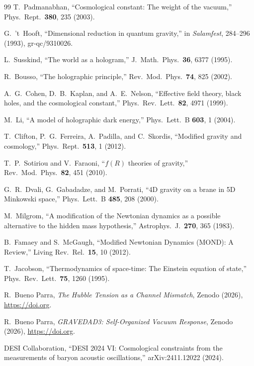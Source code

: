 \documentclass[prd,
               reprint,
               aps,
               preprintnumbers,
               nofootinbib,
               longbibliography,
               floatfix]{revtex4-2}
\begin{document}
\begin{thebibliography}{99}
T.~Padmanabhan,
``Cosmological constant: The weight of the vacuum,''
Phys.\ Rept.\ {\bf 380}, 235 (2003).

G.~'t~Hooft,
``Dimensional reduction in quantum gravity,''
in \emph{Salamfest}, 284--296 (1993), gr-qc/9310026.

L.~Susskind,
``The world as a hologram,''
J.\ Math.\ Phys.\ {\bf 36}, 6377 (1995).

R.~Bousso,
``The holographic principle,''
Rev.\ Mod.\ Phys.\ {\bf 74}, 825 (2002).

A.~G.~Cohen, D.~B.~Kaplan, and A.~E.~Nelson,
``Effective field theory, black holes, and the cosmological constant,''
Phys.\ Rev.\ Lett.\ {\bf 82}, 4971 (1999).

M.~Li,
``A model of holographic dark energy,''
Phys.\ Lett.\ B {\bf 603}, 1 (2004).

T.~Clifton, P.~G.~Ferreira, A.~Padilla, and C.~Skordis,
``Modified gravity and cosmology,''
Phys.\ Rept.\ {\bf 513}, 1 (2012).

T.~P.~Sotiriou and V.~Faraoni,
``$f(R)$ theories of gravity,''
Rev.\ Mod.\ Phys.\ {\bf 82}, 451 (2010).

G.~R.~Dvali, G.~Gabadadze, and M.~Porrati,
``4D gravity on a brane in 5D Minkowski space,''
Phys.\ Lett.\ B {\bf 485}, 208 (2000).

M.~Milgrom,
``A modification of the Newtonian dynamics as a possible alternative to 
the hidden mass hypothesis,''
Astrophys.\ J.\ {\bf 270}, 365 (1983).

B.~Famaey and S.~McGaugh,
``Modified Newtonian Dynamics (MOND): A Review,''
Living Rev.\ Rel.\ {\bf 15}, 10 (2012).

T.~Jacobson,
``Thermodynamics of space-time: The Einstein equation of state,''
Phys.\ Rev.\ Lett.\ {\bf 75}, 1260 (1995).

R.~Bueno Parra,
\emph{The Hubble Tension as a Channel Mismatch},
Zenodo (2026), \url{https://doi.org}.

R.~Bueno Parra,
\emph{GRAVEDAD3: Self-Organized Vacuum Response},
Zenodo (2026), \url{https://doi.org}.

DESI Collaboration,
``DESI 2024 VI: Cosmological constraints from the measurements of baryon acoustic oscillations,''
arXiv:2411.12022 (2024).


\end{thebibliography}
\end{document}
